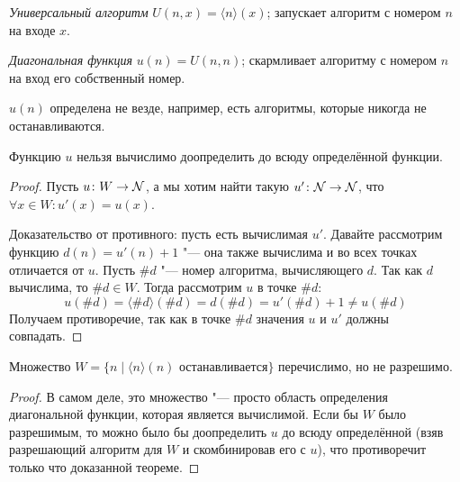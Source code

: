 \begin{Def}
	\textit{Универсальный алгоритм} $U(n, x) = \langle n \rangle (x)$; запускает алгоритм с номером $n$ на входе $x$.
\end{Def}
\begin{Def}
	\textit{Диагональная функция} $u(n) = U(n, n)$; скармливает алгоритму с номером $n$ на вход его собственный номер.
\end{Def}
\begin{Rem}
	$u(n)$ определена не везде, например, есть алгоритмы, которые никогда не останавливаются.
\end{Rem}

\begin{theorem}\label{diagonalFunc}
	Функцию $u$ нельзя вычислимо доопределить до всюду определённой функции.
\end{theorem}
\begin{proof}
	Пусть $u \colon W \to \mathcal{N}$, а мы хотим найти такую $u' \colon \mathcal{N} \to \mathcal{N}$, что $\forall x \in W \colon u'(x)=u(x)$.

	Доказательство от противного: пусть есть вычислимая $u'$.
	Давайте рассмотрим функцию $d(n)=u'(n)+1$ "--- она также вычислима и во всех точках отличается от $u$.
	Пусть $\#d$ "--- номер алгоритма, вычисляющего $d$.
	Так как $d$ вычислима, то $\#d \in W$.
	Тогда рассмотрим $u$ в точке $\#d$:
	\[ u(\#d) = \langle \#d \rangle (\#d) = d(\#d) = u'(\#d) + 1 \neq u(\#d) \]
	Получаем противоречие, так как в точке $\#d$ значения $u$ и $u'$ должны совпадать.
\end{proof}


\begin{conseq}
	Множество $W = \{n \mid \langle n \rangle(n)\text{~останавливается}\}$ перечислимо, но не разрешимо.
\end{conseq}
\begin{proof}
	В самом деле, это множество "--- просто область определения диагональной функции, которая является вычислимой.
	Если бы $W$ было разрешимым, то можно было бы доопределить $u$ до всюду определённой (взяв разрешающий алгоритм для $W$ и скомбинировав его с $u$),
	что противоречит только что доказанной теореме.
\end{proof}

